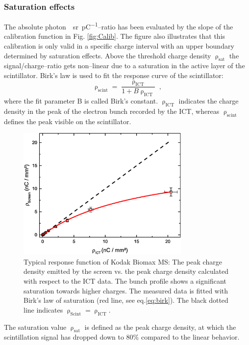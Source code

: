\documentclass[%
preprint,
amsmath,
amssymb,
aip,
rsi, 
numerical,
floatfix,
]{revtex4-1}
\begin{document}
\subsubsection{\label{Se}Saturation effects}
The absolute \si{photon \per \steradian \per \pico\coulomb}--ratio has been evaluated by the slope of the calibration function in Fig. \ref{fig:Calib}. 
The figure also illustrates that this calibration is only valid in a specific charge interval with an upper boundary determined by saturation effects. 
Above the threshold charge density $\uprho_{\text{sat}}$ the signal/charge--ratio gets non--linear due to a saturation in the active layer of the scintillator.
Birk’s law is used to fit the response curve of the scintillator:
\begin{equation}
\uprho_{\text{scint}} = \frac{\uprho_{\text{ICT}}}{1+B\uprho_{\text{ICT}}}{\;,}
\label{eq:birk}
\end{equation}
where the fit parameter B is called Birk's constant.
$\uprho_{\text{ICT}}$ indicates the charge density in the peak of the electron bunch recorded by the ICT, whereas $\uprho_{\text{scint}}$ defines the peak visible on the scintillator.
\begin{figure}
\includegraphics[width=8.5cm]{./Figures/Sat}%
\caption{\label{fig:Sat} Typical response function of Kodak Biomax MS: The peak charge density emitted by the screen vs. the peak charge density calculated with respect to the ICT data. 
The bunch profile shows a significant saturation towards higher charges. 
The measured data is fitted with Birk's law of saturation (red line, see eq.\ref{eq:birk}). 
The black dotted line indicates $\uprho_{\text{Scint}} = \uprho_{\text{ICT}}$.}
\end{figure}
The saturation value $\uprho_{\text{sat}}$ is defined as the peak charge density, at which the scintillation signal has dropped down to 80$\%$ compared to the linear behavior.
\end{document}
